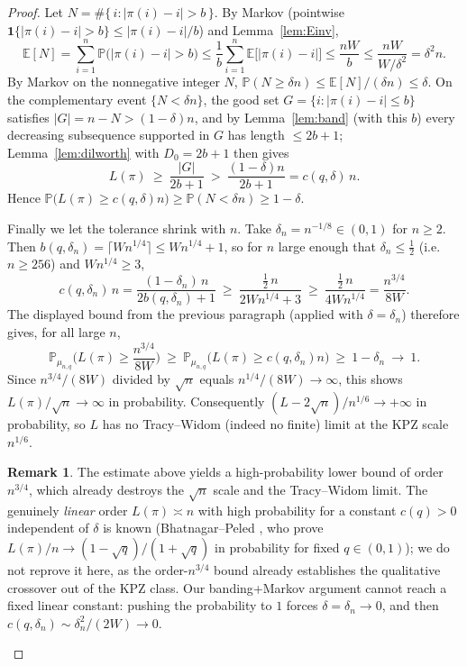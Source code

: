 \documentclass[12pt]{article}
\theoremstyle{definition}
\newtheorem{remark}{Remark}
\newcommand{\E}{\mathbb{E}}
\newcommand{\PP}{\mathbb{P}}
\begin{document}
\begin{proof}
Let $N=\#\{\,i:|\pi(i)-i|>b\,\}$. By Markov (pointwise $\mathbf 1\{|\pi(i)-i|>b\}\le
|\pi(i)-i|/b$) and Lemma~\ref{lem:Einv},
\[
\E[N]=\sum_{i=1}^n\PP\big(|\pi(i)-i|>b\big)\le\frac1b\sum_{i=1}^n\E\big[|\pi(i)-i|\big]
\le\frac{nW}{b}\le \frac{nW}{W/\delta^2}=\delta^2 n.
\]
By Markov on the nonnegative integer $N$,
$\PP(N\ge \delta n)\le \E[N]/(\delta n)\le \delta$. On the complementary event
$\{N<\delta n\}$, the good set $G=\{i:|\pi(i)-i|\le b\}$ satisfies $|G|=n-N>(1-\delta)n$,
and by Lemma~\ref{lem:band} (with this $b$) every decreasing subsequence supported in
$G$ has length $\le 2b+1$; Lemma~\ref{lem:dilworth} with $D_0=2b+1$ then gives
\[
L(\pi)\ \ge\ \frac{|G|}{2b+1}\ >\ \frac{(1-\delta)n}{2b+1}=c(q,\delta)\,n .
\]
Hence $\PP\big(L(\pi)\ge c(q,\delta)n\big)\ge \PP(N<\delta n)\ge 1-\delta$.

Finally we let the tolerance shrink with $n$. Take $\delta_n=n^{-1/8}\in(0,1)$ for
$n\ge2$. Then $b(q,\delta_n)=\lceil W n^{1/4}\rceil\le W n^{1/4}+1$, so for $n$ large
enough that $\delta_n\le\tfrac12$ (i.e.\ $n\ge256$) and $Wn^{1/4}\ge3$,
\[
c(q,\delta_n)\,n=\frac{(1-\delta_n)\,n}{2b(q,\delta_n)+1}
\ \ge\ \frac{\tfrac12\,n}{2Wn^{1/4}+3}\ \ge\ \frac{\tfrac12\,n}{4Wn^{1/4}}
=\frac{n^{3/4}}{8W}.
\]
The displayed bound from the previous paragraph (applied with $\delta=\delta_n$) therefore
gives, for all large $n$,
\[
\PP_{\mu_{n,q}}\!\Big(L(\pi)\ge \frac{n^{3/4}}{8W}\Big)
\ \ge\ \PP_{\mu_{n,q}}\big(L(\pi)\ge c(q,\delta_n)n\big)\ \ge\ 1-\delta_n\ \to\ 1.
\]
Since $n^{3/4}/(8W)$ divided by $\sqrt n$
equals $n^{1/4}/(8W)\to\infty$, this shows $L(\pi)/\sqrt n\to\infty$ in probability.
Consequently $(L-2\sqrt n)/n^{1/6}\to+\infty$ in probability, so $L$ has no
Tracy--Widom (indeed no finite) limit at the KPZ scale $n^{1/6}$.

\begin{remark}
The estimate above yields a high-probability lower bound of order $n^{3/4}$, which already
destroys the $\sqrt n$ scale and the Tracy--Widom limit. The genuinely \emph{linear} order
$L(\pi)\asymp n$ with high probability for a constant $c(q)>0$ independent of $\delta$ is
known (Bhatnagar--Peled \cite{BP}, who prove $L(\pi)/n\to(1-\sqrt q)/(1+\sqrt q)$ in
probability for fixed $q\in(0,1)$); we do not reprove it here, as the order-$n^{3/4}$ bound
already establishes the qualitative crossover out of the KPZ class. Our banding+Markov
argument cannot reach a fixed linear constant: pushing the probability to $1$ forces
$\delta=\delta_n\to0$, and then $c(q,\delta_n)\sim\delta_n^2/(2W)\to0$.
\end{remark}
\end{proof}
\end{document}

